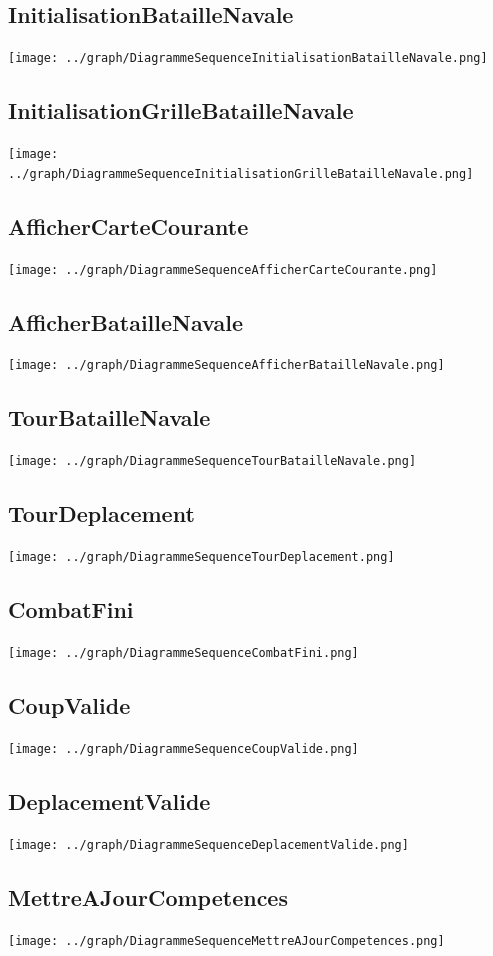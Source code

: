         \subsection{InitialisationBatailleNavale}
            \texttt{[image: ../graph/DiagrammeSequenceInitialisationBatailleNavale.png]}
        \subsection{InitialisationGrilleBatailleNavale}
            \texttt{[image: ../graph/DiagrammeSequenceInitialisationGrilleBatailleNavale.png]}
        \subsection{AfficherCarteCourante}
            \texttt{[image: ../graph/DiagrammeSequenceAfficherCarteCourante.png]}
        \subsection{AfficherBatailleNavale}
            \texttt{[image: ../graph/DiagrammeSequenceAfficherBatailleNavale.png]}
        \subsection{TourBatailleNavale}
            \texttt{[image: ../graph/DiagrammeSequenceTourBatailleNavale.png]}
        \subsection{TourDeplacement}
            \texttt{[image: ../graph/DiagrammeSequenceTourDeplacement.png]}
        \subsection{CombatFini}
            \texttt{[image: ../graph/DiagrammeSequenceCombatFini.png]}
        \subsection{CoupValide}
            \texttt{[image: ../graph/DiagrammeSequenceCoupValide.png]}
        \subsection{DeplacementValide}
            \texttt{[image: ../graph/DiagrammeSequenceDeplacementValide.png]}
        \subsection{MettreAJourCompetences}
            \texttt{[image: ../graph/DiagrammeSequenceMettreAJourCompetences.png]}
